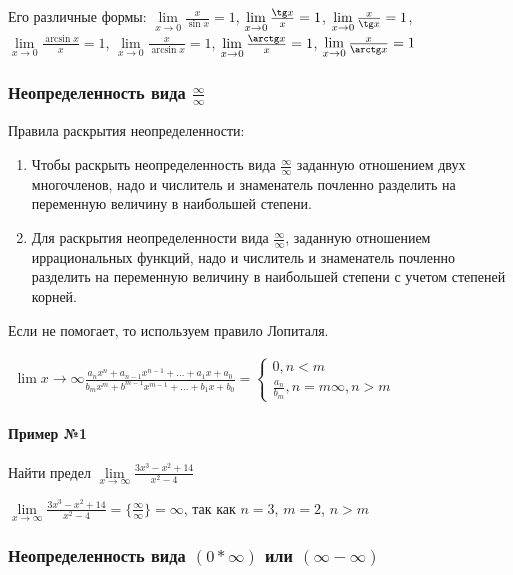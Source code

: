\documentclass{article}
\begin{document}
\begin{flushleft}
Его различные формы: $\lim\limits_{x \to 0} \frac{x}{\sin x} = 1$, $\lim\limits_{x \to 0} \frac{\tg x}{x} = 1$, $\lim\limits_{x \to 0} \frac{x}{\tg x} = 1$, $\lim\limits_{x \to 0} \frac{\arcsin x}{x} = 1$, $\lim\limits_{x \to 0} \frac{x}{\arcsin x} = 1$, $\lim\limits_{x \to 0} \frac{\arctg x}{x} = 1$, $\lim\limits_{x \to 0} \frac{x}{\arctg x} = 1$

\subsubsection{Неопределенность вида $\frac{\infty}{\infty}$}

Правила раскрытия неопределенности:

\begin{enumerate}
    \item Чтобы раскрыть неопределенность вида $\frac{\infty}{\infty}$ заданную отношением двух многочленов, надо и числитель и знаменатель почленно разделить на переменную величину в наибольшей степени.
    \item Для раскрытия неопределенности вида $\frac{\infty}{\infty}$, заданную отношением иррациональных функций, надо и числитель и знаменатель почленно разделить на переменную величину в наибольшей степени с учетом степеней корней.
\end{enumerate}

Если не помогает, то используем правило Лопиталя.

$
\begin{aligned}
\lim\limits{x \to \infty} \frac{a_n x^n + a_{n - 1} x^{n - 1} + \dots + a_1 x + a_0}{b_m x^m + b^{m - 1} x^{m - 1} + \dots + b_1 x + b_0} = \begin{cases}
    0, n < m \\
    \frac{a_n}{b_m}, n = m
    \infty, n > m
\end{cases}
\end{aligned}
$

\paragraph{Пример №1} Найти предел $\lim\limits_{x \to \infty} \frac{3x^3 - x^2 + 14}{x^2 - 4}$

$\lim\limits_{x \to \infty} \frac{3x^3 - x^2 + 14}{x^2 - 4} = \{ \frac{\infty}{\infty} \} = \infty$, так как $n = 3$, $m = 2$, $n > m$

\subsubsection{Неопределенность вида $(0 * \infty)$ или $(\infty - \infty)$}


\end{flushleft}
\end{document}
